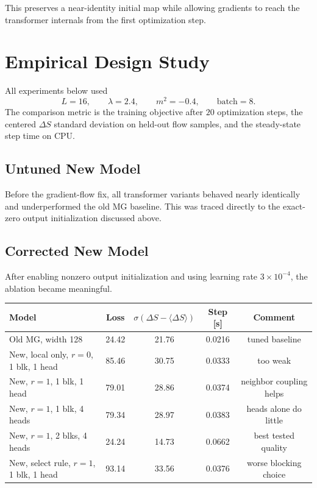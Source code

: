 \documentclass[11pt]{article}
\begin{document}
This preserves a near-identity initial map while allowing gradients to reach
the transformer internals from the first optimization step.

\section{Empirical Design Study}

All experiments below used
\[
L=16,\qquad \lambda=2.4,\qquad m^2=-0.4,\qquad \text{batch}=8.
\]
The comparison metric is the training objective after $20$ optimization steps,
the centered $\Delta S$ standard deviation on held-out flow samples, and the
steady-state step time on CPU.

\subsection{Untuned New Model}

Before the gradient-flow fix, all transformer variants behaved nearly
identically and underperformed the old MG baseline. This was traced directly to
the exact-zero output initialization discussed above.

\subsection{Corrected New Model}

After enabling nonzero output initialization and using learning rate
$3\times 10^{-4}$, the ablation became meaningful.

\begin{center}
\begin{tabular}{lcccc}
\toprule
Model & Loss & $\sigma(\Delta S-\langle \Delta S\rangle)$ & Step [s] & Comment \\
\midrule
Old MG, width 128 & 24.42 & 21.76 & 0.0216 & tuned baseline \\
New, local only, $r{=}0$, 1 blk, 1 head & 85.46 & 30.75 & 0.0333 & too weak \\
New, $r{=}1$, 1 blk, 1 head & 79.01 & 28.86 & 0.0374 & neighbor coupling helps \\
New, $r{=}1$, 1 blk, 4 heads & 79.34 & 28.97 & 0.0383 & heads alone do little \\
New, $r{=}1$, 2 blks, 4 heads & 24.24 & 14.73 & 0.0662 & best tested quality \\
New, select rule, $r{=}1$, 1 blk, 1 head & 93.14 & 33.56 & 0.0376 & worse blocking choice \\
\bottomrule
\end{tabular}
\end{center}
\end{document}
